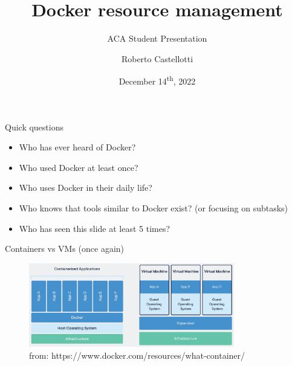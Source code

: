 \documentclass[
  english,          
  aspectratio=169,    %
]{tumbeamer}
\title{Docker resource management}
\subtitle{ACA Student Presentation }
\author{Roberto Castellotti}
\institute{\theDepartmentName\\\theUniversityName}
\date[14/12/2022]{December 14\textsuperscript{th}, 2022}
\begin{document}
\maketitle

\begin{frame}{Quick questions}
  \begin{itemize}
    \item Who has ever heard of Docker?
    \item Who used Docker at least once?
    \item Who uses Docker in their daily life?
    \item Who knows that  tools similar to Docker exist? (or focusing on subtasks)
    \item Who has seen this slide at least 5 times?
  \end{itemize}
\end{frame}

\begin{frame}{Containers vs VMs (once again)}
\begin{figure}
    \centering
    \includegraphics[width=0.8\textwidth]{container-vs-vms.png}
    \caption{from: https://www.docker.com/resources/what-container/ }
    \label{fig:my_label}
\end{figure}
    
\end{frame}
\end{document}
